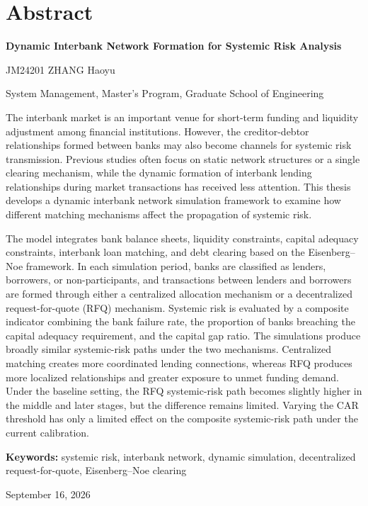 \clearpage
\chapter*{Abstract}
\begin{center}
{\large\bfseries Dynamic Interbank Network Formation for Systemic Risk Analysis\par}
\vspace{0.35em}
JM24201 ZHANG Haoyu\par
System Management, Master's Program, Graduate School of Engineering
\end{center}
\vspace{0.8em}
\begin{abstractblock}
The interbank market is an important venue for short-term funding and liquidity adjustment among financial institutions. However, the creditor-debtor relationships formed between banks may also become channels for systemic risk transmission. Previous studies often focus on static network structures or a single clearing mechanism, while the dynamic formation of interbank lending relationships during market transactions has received less attention. This thesis develops a dynamic interbank network simulation framework to examine how different matching mechanisms affect the propagation of systemic risk.

The model integrates bank balance sheets, liquidity constraints, capital adequacy constraints, interbank loan matching, and debt clearing based on the \mbox{Eisenberg--Noe} framework. In each simulation period, banks are classified as lenders, borrowers, or non-participants, and transactions between lenders and borrowers are formed through either a centralized allocation mechanism or a decentralized request-for-quote (RFQ) mechanism. Systemic risk is evaluated by a composite indicator combining the bank failure rate, the proportion of banks breaching the capital adequacy requirement, and the capital gap ratio. The simulations produce broadly similar systemic-risk paths under the two mechanisms. Centralized matching creates more coordinated lending connections, whereas RFQ produces more localized relationships and greater exposure to unmet funding demand. Under the baseline setting, the RFQ systemic-risk path becomes slightly higher in the middle and later stages, but the difference remains limited. Varying the CAR threshold has only a limited effect on the composite systemic-risk path under the current calibration.
\end{abstractblock}
\vspace{0.8em}
\noindent\textbf{Keywords:} systemic risk, interbank network, dynamic simulation, decentralized request-for-quote, \mbox{Eisenberg--Noe} clearing
\vfill
\begin{flushright}September 16, 2026\end{flushright}

\clearpage
\begingroup
{}
\setlength{\emergencystretch}{3em}
\tableofcontents
\endgroup
\clearpage
